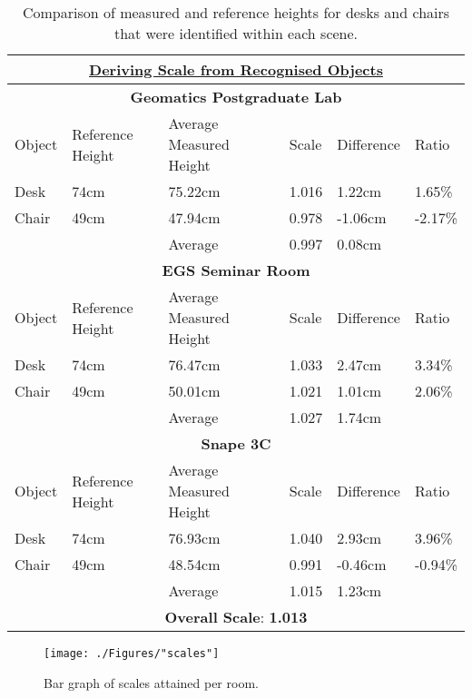 \begin{table}[h!]
	\centering
	\begin{tabular}{|p{1.25cm}|p{2cm}|p{3.5cm}|p{1.85cm}|p{2cm}|p{1.25cm}|}
		\hline
		\multicolumn{6}{|c|}{\textbf{\underline{Deriving Scale from Recognised Objects}}} \\
		\hline
		\multicolumn{6}{|c|}{\textbf{Geomatics Postgraduate Lab}} \\
		\hline
		Object & Reference Height & Average Measured Height & Scale & Difference & Ratio \\
		\hline
		Desk & 74cm & 75.22cm & 1.016 & 1.22cm & 1.65\% \\
		Chair & 49cm & 47.94cm & 0.978 & -1.06cm & -2.17\% \\
		\hline
		& & Average & 0.997 & 0.08cm &\\
		\hline
		\multicolumn{6}{|c|}{\textbf{EGS Seminar Room}} \\
		\hline
		Object & Reference Height & Average Measured Height & Scale & Difference & Ratio \\
		\hline
		Desk & 74cm & 76.47cm & 1.033 & 2.47cm & 3.34\% \\
		Chair & 49cm & 50.01cm & 1.021 & 1.01cm & 2.06\% \\
		\hline
		& & Average & 1.027 & 1.74cm &\\
		\hline
		\multicolumn{6}{|c|}{\textbf{Snape 3C}} \\
		\hline
		Object & Reference Height & Average Measured Height & Scale & Difference & Ratio \\
		\hline
		Desk & 74cm & 76.93cm & 1.040 & 2.93cm & 3.96\% \\
		Chair & 49cm & 48.54cm & 0.991 & -0.46cm & -0.94\% \\
		\hline
		& & Average & 1.015 & 1.23cm &\\
		\hline
		\multicolumn{6}{|c|}{\textbf{Overall Scale}: \textbf{1.013}}\\
		\hline
	\end{tabular}
	\caption[Comparing measured and reference heights for identified objects per scene]{Comparison of measured and reference heights for desks and chairs that were identified within each scene.}
	\label{scale}
\end{table}

\begin{figure}[h!]
	\centering
	\texttt{[image: ./Figures/"scales"]}
	\caption{Bar graph of scales attained per room. \label{scalegraph}}
\end{figure}
\clearpage

